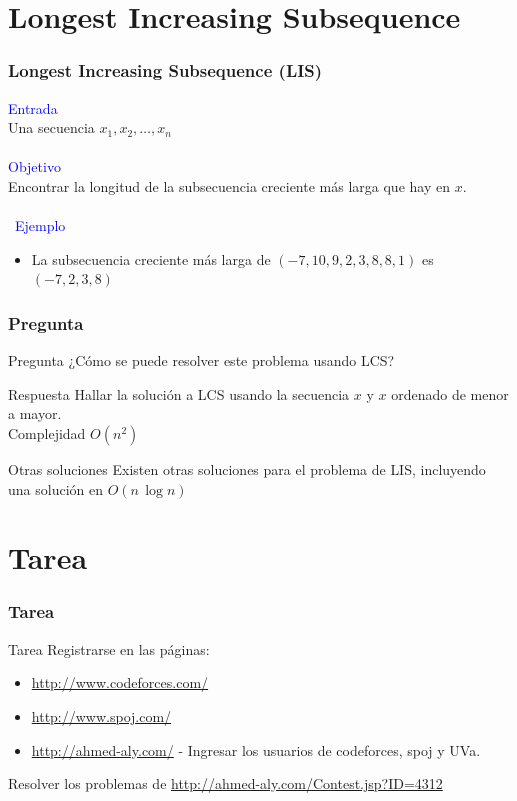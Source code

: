 \documentclass{beamer}
\begin{document}
\section[LIS]{Longest Increasing Subsequence}
	\begin{frame}
		\frametitle{Longest Increasing Subsequence (LIS)}
		\textcolor{blue}{\large Entrada}\\
		Una secuencia $x_1, x_2, \ldots, x_n$\\ \quad \\
		\textcolor{blue}{\large Objetivo}\\
		Encontrar la longitud de la subsecuencia creciente más larga que hay en $x$.\\ \quad \\\
		\textcolor{blue}{\large Ejemplo}\\
		\begin{itemize}
			\item La subsecuencia creciente más larga de $(-7, 10, 9, 2, 3, 8, 8, 1)$ es $(-7, 2, 3, 8)$
		\end{itemize}
	\end{frame}
	
	\begin{frame}
		\frametitle{Pregunta}
		\begin{alertblock}{Pregunta}
			¿Cómo se puede resolver este problema usando LCS?
		\end{alertblock}
		\pause
		\begin{exampleblock}{Respuesta}
			Hallar la solución a LCS usando la secuencia $x$ y $x$ ordenado de menor a mayor.\\
			Complejidad $O(n^2)$
		\end{exampleblock}
		\pause
		\begin{block}{Otras soluciones}
			Existen otras soluciones para el problema de LIS, incluyendo una solución en $O(n\,\operatorname{log} n)$
		\end{block}
	\end{frame}

\section{Tarea}
	\begin{frame}[fragile]
		\frametitle{Tarea}
		\begin{alertblock}{Tarea}
			Registrarse en las páginas:
			\begin{itemize}
				\item \url{http://www.codeforces.com/}
				\item \url{http://www.spoj.com/}
				\item \url{http://ahmed-aly.com/} - Ingresar los usuarios de codeforces, spoj y UVa.
			\end{itemize}	
			Resolver los problemas de \url{http://ahmed-aly.com/Contest.jsp?ID=4312}
		\end{alertblock}
	\end{frame}
	
\end{document}
